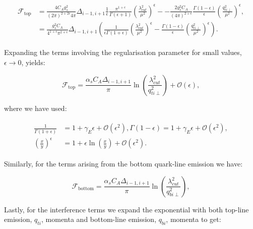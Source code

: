 		\begin{align}
		\begin{split}
			\mathcal{F}_{\text{top}} &= \frac{4C_Ag_s^2}{(2\pi)^{2+2\epsilon}4\pi}\Delta_{i-1, i+1}\frac{1}{\epsilon}\frac{\pi^{1+\epsilon}}
			{\Gamma(\epsilon+1)}\left(\frac{\lambda_{cut}^2}{\mu^2}\right)^\epsilon - -\frac{2g_s^2C_A}{(4\pi)^{2+\epsilon}}
			\frac{\Gamma(1-\epsilon)}{\epsilon}\left(\frac{q_{ti\perp}^2}{\mu^2}\right)^\epsilon, \\
			&= \frac{g_s^2C_A}{4^{1+\epsilon}\pi^{2+\epsilon}}\Delta_{i-1, i+1}\left(\frac{1}{\epsilon\Gamma(1+\epsilon)}
			\left(\frac{\lambda_{cut}^2}{\mu^2}\right)^\epsilon - \frac{\Gamma(1-\epsilon)}{\epsilon}
			\left(\frac{q_{ti\perp}^2}{\mu^2}\right)^\epsilon\right).
		\end{split}
		\end{align}

		Expanding the terms involving the regularisation parameter for small values,
		$\epsilon\to0$, yields:

		\begin{equation}
			\mathcal{F}_{\text{top}} = \frac{\alpha_sC_A\Delta_{i-1, i+1}}{\pi}
			\ln\left(\frac{\lambda_{cut}^2}{q_{ti\perp}^2}\right) + \mathcal{O}(\epsilon),
		\end{equation}

		where we have used:

		\begin{align}
		\begin{split}
			\frac{1}{\Gamma(1+\epsilon)} &= 1 + \gamma_E\epsilon + \mathcal{O}(\epsilon^2),
			\Gamma(1-\epsilon) = 1 + \gamma_E\epsilon + \mathcal{O}(\epsilon^2),\\
			\left(\frac{x}{y}\right)^\epsilon &= 1 + \epsilon\ln\left(\frac{x}{y}\right) +
			\mathcal{O}(\epsilon^2).
		\end{split}
		\end{align}

		Similarly, for the terms arising from the bottom quark-line emission we have:

		\begin{equation}
		\mathcal{F}_{\text{bottom}} = \frac{\alpha_sC_A\Delta_{i-1, i+1}}{\pi}\ln\left(\frac{\lambda_{cut}^2}{q_{bi\perp}^2}\right),
		\end{equation}

		Lastly, for the interference terms we expand the exponential with both top-line emission, $q_{ti}$,
		momenta and bottom-line emission, $q_{bi}$, momenta to get:

